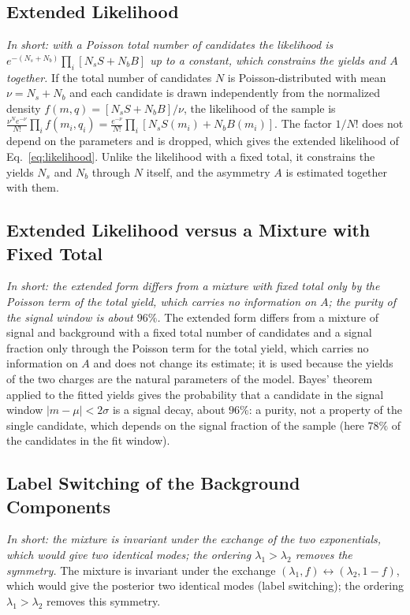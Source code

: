\subsection{Extended Likelihood}
\emph{In short: with a Poisson total number of candidates the likelihood is $e^{-(N_s+N_b)}\prod_i[N_s S+N_b B]$ up to a constant, which constrains the yields and $A$ together.}
If the total number of candidates $N$ is Poisson-distributed with mean $\nu=N_s+N_b$ and each candidate is drawn independently from the normalized density $f(m,q)=[N_s S+N_b B]/\nu$, the likelihood of the sample is $\frac{\nu^N e^{-\nu}}{N!}\prod_{i}f(m_i,q_i)=\frac{e^{-\nu}}{N!}\prod_i[N_s S(m_i)+N_b B(m_i)]$. The factor $1/N!$ does not depend on the parameters and is dropped, which gives the extended likelihood of Eq.~\eqref{eq:likelihood}. Unlike the likelihood with a fixed total, it constrains the yields $N_s$ and $N_b$ through $N$ itself, and the asymmetry $A$ is estimated together with them.
\subsection{Extended Likelihood versus a Mixture with Fixed Total}
\emph{In short: the extended form differs from a mixture with fixed total only by the Poisson term of the total yield, which carries no information on $A$; the purity of the signal window is about $96\%$.}
The extended form differs from a mixture of signal and background with a fixed total number of candidates and a signal fraction only through the Poisson term for the total yield, which carries no information on $A$ and does not change its estimate; it is used because the yields of the two charges are the natural parameters of the model. Bayes' theorem applied to the fitted yields gives the probability that a candidate in the signal window $|m-\mu|<2\sigma$ is a signal decay, about $96\%$: a purity, not a property of the single candidate, which depends on the signal fraction of the sample (here $78\%$ of the candidates in the fit window).
\subsection{Label Switching of the Background Components}
\emph{In short: the mixture is invariant under the exchange of the two exponentials, which would give two identical modes; the ordering $\lambda_1>\lambda_2$ removes the symmetry.}
The mixture is invariant under the exchange $(\lambda_1,f)\leftrightarrow(\lambda_2,1-f)$, which would give the posterior two identical modes (label switching); the ordering $\lambda_1>\lambda_2$ removes this symmetry.

